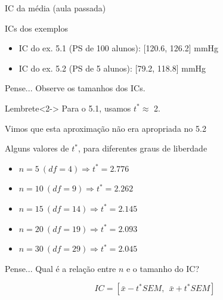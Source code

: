 \documentclass{beamer}
\begin{document}


\begin{frame}{IC da média (aula passada)}
  \begin{exampleblock}{ICs dos exemplos}
    \begin{itemize}
    \item IC do ex. 5.1 (PS de 100 alunos): [120.6, 126.2] mmHg
    \item IC do ex. 5.2 (PS de   5 alunos): [79.2, 118.8] mmHg
    \end{itemize}
  \end{exampleblock}
  \begin{block}{Pense...}
    Observe os tamanhos dos ICs.
  \end{block}
  \begin{block}{Lembrete}<2->
    Para o 5.1, usamos $t^{*} \approx$ 2.

    \bigskip
    Vimos que esta aproximação \alert{não era apropriada} no 5.2
  \end{block}

\end{frame}

\begin{frame}{Alguns valores de $t^{*}$, para diferentes graus de liberdade}
  \begin{itemize}
  \item $n = 5\ (df = 4) \Rightarrow t^{*} = 2.776$
  \item $n = 10\ (df = 9) \Rightarrow t^{*} = 2.262$
  \item $n = 15\ (df = 14) \Rightarrow t^{*} = 2.145$
  \item $n = 20\ (df = 19) \Rightarrow t^{*} = 2.093$
  \item $n = 30\ (df = 29) \Rightarrow t^{*} = 2.045$
  \end{itemize}
  \begin{block}{Pense...}
    Qual é a relação entre $n$ e o tamanho do IC?

    \begin{displaymath}
      IC = \left[ \bar{x} - t^{*} SEM,\ \ \bar{x} + t^{*} SEM \right]
    \end{displaymath}
  \end{block}
\end{frame}
\end{document}

